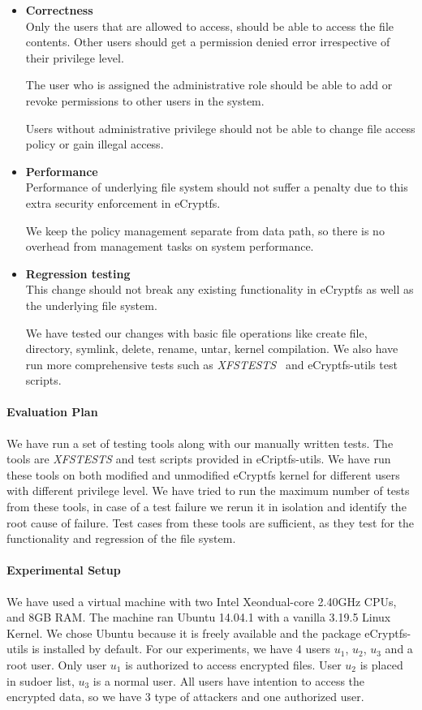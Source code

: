 \begin{itemize}
\item
\textbf{Correctness}\\
Only the users that are allowed to access, should be able to access
the file contents.  Other users should get a permission denied error
irrespective of their privilege level.

The user who is assigned the administrative role should be able to add
or revoke permissions to other users in the system.

Users without administrative privilege should not be able to change
file access policy or gain illegal access.
\item
\textbf{Performance}\\ Performance of underlying file system should
not suffer a penalty due to this extra security enforcement in
eCryptfs.

We keep the policy management separate from data path, so there is no
overhead from management tasks on system performance.
\item
\textbf{Regression testing}\\ This change should not break any
existing functionality in eCryptfs as well as the underlying file
system.

We have tested our changes with basic file operations like create
file, directory, symlink, delete, rename, untar, kernel compilation.
We also have run more comprehensive tests such as
\emph{XFSTESTS}~\cite{xfstests} and eCryptfs-utils test scripts.
\end{itemize}

\paragraph{Evaluation Plan}
We have run a set of testing tools along with our manually written
tests.  The tools are \emph{XFSTESTS} and test scripts provided in
eCriptfs-utils.  We have run these tools on both modified and
unmodified eCryptfs kernel for different users with different
privilege level.  We have tried to run the maximum number of tests
from these tools, in case of a test failure we rerun it in isolation and
identify the root cause of failure.  Test cases from these tools are
sufficient, as they test for the functionality and regression of the file
system.

\paragraph{Experimental Setup}
We have used a virtual machine with two Intel\textregistered
Xeon\texttrademark dual-core 2.40GHz CPUs, and 8GB RAM.  The machine
ran \mbox{Ubuntu} 14.04.1 with a vanilla 3.19.5 Linux Kernel.  We
chose \mbox{Ubuntu} because it is freely available and the package
eCryptfs-utils is installed by default.  For our experiments, we have
4 users $u_1$, $u_2$, $u_3$ and a root user.  Only user $u_1$ is
authorized to access encrypted files.  User $u_2$ is placed in sudoer
list, $u_3$ is a normal user.  All users have intention to access the
encrypted data, so we have 3 type of attackers and one authorized
user.


